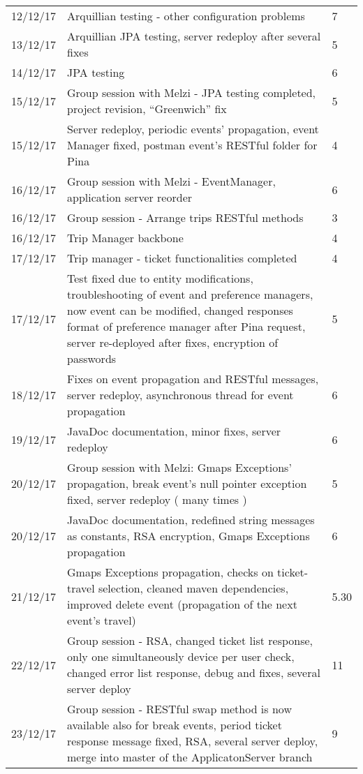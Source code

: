 \begin{longtable}{ p{2cm} p{10cm} p{3cm}}
	12/12/17 & Arquillian testing - other configuration problems & 7 \\
	13/12/17 & Arquillian JPA testing, server redeploy after several fixes & 5 \\
	14/12/17 & JPA testing & 6 \\
	15/12/17 & Group session with Melzi - JPA testing completed, project revision, “Greenwich” fix & 5 \\
	15/12/17 & Server redeploy, periodic events' propagation, event Manager fixed, postman event's RESTful folder for Pina & 4 \\
	16/12/17 & Group session with Melzi - EventManager, application server reorder  & 6 \\
	16/12/17 & Group session - Arrange trips RESTful methods & 3 \\
	16/12/17 & Trip Manager backbone & 4 \\
	17/12/17 & Trip manager - ticket functionalities completed & 4 \\
	17/12/17 & Test fixed due to entity modifications, troubleshooting of event and preference managers, now event can be modified, changed responses format of preference manager after Pina request, server re-deployed after fixes, encryption of passwords & 5 \\
	18/12/17 & Fixes on event propagation and RESTful messages, server redeploy, asynchronous thread for event propagation
 & 6 \\
	19/12/17 & JavaDoc documentation, minor fixes, server redeploy & 6 \\
	20/12/17 & Group session with Melzi: Gmaps Exceptions' propagation, break event's null pointer exception fixed, server redeploy ( many times ) & 5 \\
	20/12/17 & JavaDoc documentation, redefined string messages as constants, RSA encryption, Gmaps Exceptions propagation & 6 \\
	21/12/17 & Gmaps Exceptions propagation, checks on ticket-travel selection, cleaned maven dependencies, improved delete event (propagation of the next event's travel) & 5.30 \\
	22/12/17 & Group session - RSA, changed ticket list response, only one simultaneously device per user check, changed error list response, debug and fixes, several server deploy & 11 \\
	23/12/17 & Group session - RESTful swap method is now available also for break events, period ticket response message fixed, RSA, several server deploy, merge into master of the ApplicatonServer branch & 9 \\

\end{longtable}

